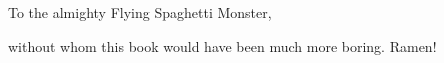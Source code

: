 
\thispagestyle{empty}

\begin{center}
To the almighty Flying Spaghetti Monster,

without whom this book would have been much more boring. Ramen!
\end{center}

